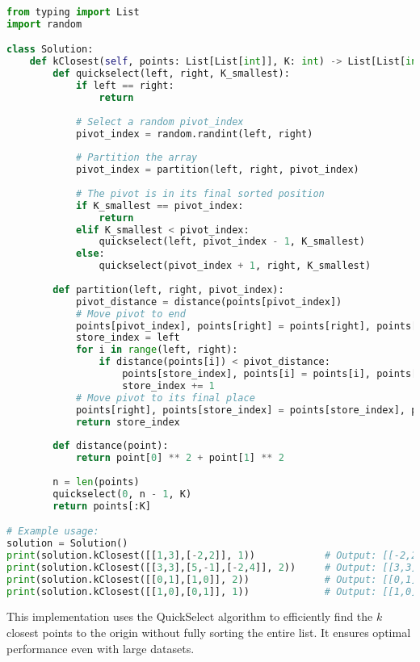 \begin{fullwidth}
\begin{lstlisting}[language=Python]
from typing import List
import random

class Solution:
    def kClosest(self, points: List[List[int]], K: int) -> List[List[int]]:
        def quickselect(left, right, K_smallest):
            if left == right:
                return
            
            # Select a random pivot_index
            pivot_index = random.randint(left, right)
            
            # Partition the array
            pivot_index = partition(left, right, pivot_index)
            
            # The pivot is in its final sorted position
            if K_smallest == pivot_index:
                return
            elif K_smallest < pivot_index:
                quickselect(left, pivot_index - 1, K_smallest)
            else:
                quickselect(pivot_index + 1, right, K_smallest)
        
        def partition(left, right, pivot_index):
            pivot_distance = distance(points[pivot_index])
            # Move pivot to end
            points[pivot_index], points[right] = points[right], points[pivot_index]
            store_index = left
            for i in range(left, right):
                if distance(points[i]) < pivot_distance:
                    points[store_index], points[i] = points[i], points[store_index]
                    store_index += 1
            # Move pivot to its final place
            points[right], points[store_index] = points[store_index], points[right]
            return store_index
        
        def distance(point):
            return point[0] ** 2 + point[1] ** 2
        
        n = len(points)
        quickselect(0, n - 1, K)
        return points[:K]

# Example usage:
solution = Solution()
print(solution.kClosest([[1,3],[-2,2]], 1))            # Output: [[-2,2]]
print(solution.kClosest([[3,3],[5,-1],[-2,4]], 2))     # Output: [[3,3],[-2,4]]
print(solution.kClosest([[0,1],[1,0]], 2))             # Output: [[0,1],[1,0]]
print(solution.kClosest([[1,0],[0,1]], 1))             # Output: [[1,0]] or [[0,1]]
\end{lstlisting}
\end{fullwidth}

This implementation uses the QuickSelect algorithm to efficiently find the \(k\) closest points to the origin without fully sorting the entire list. It ensures optimal performance even with large datasets.

